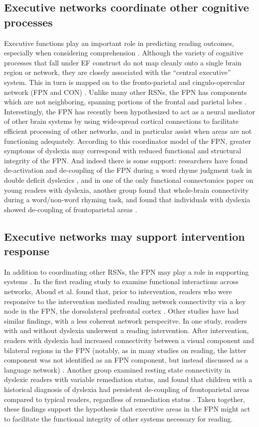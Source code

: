 \subsection{Executive networks coordinate other cognitive processes} 
Executive functions play an important role in predicting reading outcomes, especially when considering comprehension \citep{Cutting2009a}. Although the variety of cognitive processes that fall under EF construct do not map cleanly onto a single brain region or network, they are closely associated with the ``central executive'' system. This in turn is mapped on to the fronto-parietal and cingulo-opercular network (FPN and CON) \citep{Fedorenko2014a, Cocchi2013}. Unlike many other RSNs, the FPN has components which are not neighboring, spanning portions of the frontal and parietal lobes \citep{Yeo2011}. Interestingly, the FPN has recently been hypothesized to act as a neural mediator of other brain systems \citep{Menon2010, Cole2014} by using wide-spread cortical connections to facilitate efficient processing of other networks, and in particular assist when areas are not functioning adequately. According to this coordinator model of the FPN, greater symptoms of dyslexia may correspond with reduced functional and structural integrity of the FPN. And indeed there is some support: researchers have found de-activation and de-coupling of the FPN during a word rhyme judgment task in double deficit dyslexics \citep{Norton2014}, and in one of the only functional connectomics paper on young readers with dyslexia, another group found that whole-brain connectivity during a word/non-word rhyming task, and found that individuals with dyslexia showed de-coupling of frontoparietal areas \citep{Finn2014}. 

\subsection{Executive networks may support intervention response}
In addition to coordinating other RSNs, the FPN may play a role in supporting systems \citep{Cole2014}. In the first reading study to examine functional interactions across networks, Aboud et al. found that, prior to intervention, readers who were responsive to the intervention mediated reading network connectivity via a key node in the FPN, the dorsolateral prefrontal cortex \citep{Aboud2018}.  Other studies have had similar findings, with a less coherent network perspecitve. In one study, readers with and without dyslexia underwent a reading intervention. After intervention, readers with dyslexia had increased connectivity between a visual component and bilateral regions in the FPN (notably, as in many studies on reading, the latter component was not identified as an FPN component, but instead discussed as a language network) \citep{HorowitzKraus2015}. Another group examined resting state connectivity in dyslexic readers with variable remediation status, and found that children with a historical diagnosis of dyslexia had persistent de-coupling of frontoparietal areas compared to typical readers, regardless of remediation status \citep{Koyama2013}. Taken together, these findings support the hypothesis that executive areas in the FPN might act to facilitate the functional integrity of other systems necessary for reading.

